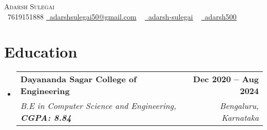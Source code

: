 \documentclass[letterpaper,11pt]{article}
\makeatletter
\newcommand{\resumeSubheading}[4]{
  \vspace{-2pt}\item
    \begin{tabular*}{1.0\textwidth}[t]{l@{\extracolsep{\fill}}r}
      \textbf{#1} & \textbf{\small #2} \\
      \textit{\small#3} & \textit{\small #4} \\
    \end{tabular*}\vspace{-7pt}
}
\newcommand{\resumeSubHeadingListStart}{\begin{itemize}[leftmargin=0.0in, label={}]}
\newcommand{\resumeSubHeadingListEnd}{\end{itemize}}
\makeatother
\begin{document}

\begin{center}
    {\Huge \scshape Adarsh Sulegai} \\ \vspace{1pt}
    \vspace{1pt}
    \small \raisebox{-0.1\height}
    \faPhone\ 7619151888 \href{mailto:adarshsulegai50@gmail.com}{\raisebox{-0.2\height}\faEnvelope\  \underline{adarshsulegai50@gmail.com}} ~ 
    \href{https://linkedin.com/in/adarsh-sulegai/}{\raisebox{-0.2\height}\faLinkedin\ \underline{adarsh-sulegai}}  ~
    \href{https://github.com/adarsh500}{\raisebox{-0.2\height}\faGithub\ \underline{adarsh500}}
    \vspace{-8pt}
\end{center}


\section{Education}
  \resumeSubHeadingListStart
    \resumeSubheading
      {Dayananda Sagar College of Engineering}{Dec 2020 -- Aug 2024}
      {B.E in Computer Science and Engineering, \textbf{CGPA: 8.84}}{Bengaluru, Karnataka}
  \resumeSubHeadingListEnd
  


\end{document}
